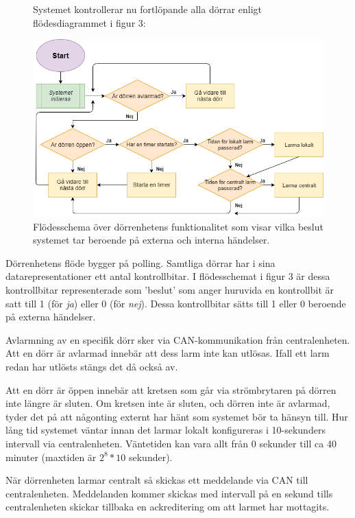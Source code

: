 \documentclass{article}
\begin{document}
\begin{figure}[H]
\begin{flushleft}
Systemet kontrollerar nu fortlöpande alla dörrar enligt flödesdiagrammet i figur 3: \linebreak \newline
\end{flushleft}
\centering
\includegraphics[scale=0.5]{figurer/Flow-Chart.png}
\caption{Flödesschema över dörrenhetens funktionalitet som visar vilka beslut systemet tar beroende på externa och interna händelser.}
\end{figure}

Dörrenhetens flöde bygger på polling. Samtliga dörrar har i sina datarepresentationer
ett antal kontrollbitar. I flödesschemat i figur 3 är dessa kontrollbitar representerade
som 'beslut' som anger huruvida en kontrollbit är satt till 1 (för \textit{ja}) eller 0
(för \textit{nej}). Dessa kontrollbitar sätts till 1 eller 0 beroende på externa händelser.

Avlarmning av en specifik dörr sker via CAN-kommunikation från centralenheten. Att en dörr är avlarmad
innebär att dess larm inte kan utlösas. Ifall ett larm redan har utlösts stängs det då också av.

Att en dörr är öppen innebär att kretsen som går via strömbrytaren på dörren inte längre är sluten.
Om kretsen inte är sluten, och dörren inte är avlarmad, tyder det på att någonting externt har hänt 
som systemet bör ta hänsyn till. Hur lång tid systemet väntar innan det larmar lokalt konfigureras i
 10-sekunders intervall via centralenheten. Väntetiden kan vara allt från 0 sekunder till ca 40 minuter
   (maxtiden är $2^8 *10$ sekunder).

När dörrenheten larmar centralt så skickas ett meddelande via CAN till centralenheten. Meddelanden
kommer skickas med intervall på en sekund tills centralenheten skickar tillbaka en ackreditering om att larmet har
 mottagits.
\end{document}
